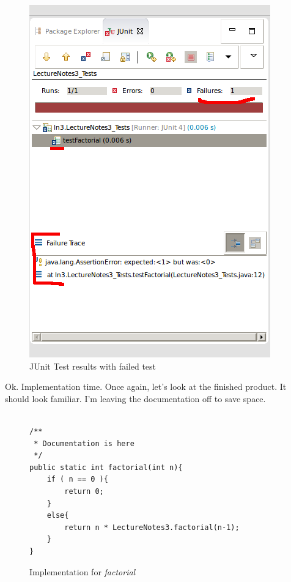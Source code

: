 \documentclass[]{tufte-handout}
\begin{document}
\vspace{.1in}
\begin{center}
\begin{figure}[!htb]
\includegraphics[scale=.5]{Eclipse-TestResult.png}
\caption{JUnit Test results with failed test} 
\label{fig:tests}
\end{figure}
\end{center}
\vspace{.1in}

Ok. Implementation time. Once again, let's look at the finished product. It should look familiar. I'm leaving the documentation off to save space. 

\begin{figure}
\begin{lstlisting}

/**
 * Documentation is here
 */
public static int factorial(int n){
	if ( n == 0 ){
		return 0;
	}
	else{
		return n * LectureNotes3.factorial(n-1);	
	}
}

\end{lstlisting}
\label{fig:factorial}
\caption{Implementation for \textit{factorial}}
\end{figure}
\end{document}
